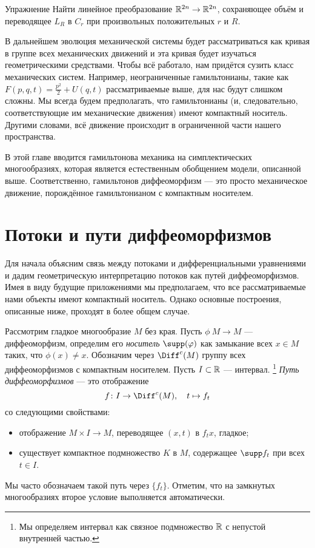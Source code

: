 \begin{ex*}{Упражнение}
Найти линейное преобразование $\mathbb{R}^{2n} \to \mathbb{R}^{2n}$, сохраняющее объём и переводящее $L_R$ в $C_r$ при произвольных положительных $r$ и $R$.
\end{ex*}

В дальнейшем эволюция механической системы будет рассматриваться как кривая в группе всех механических движений и эта кривая будет изучаться геометрическими средствами.
Чтобы всё работало, нам придётся сузить класс механических систем.
Например, неограниченные гамильтонианы, такие как $F(p,q,t) = \tfrac {p^2}2 + U(q,t)$ рассматриваемые выше, для нас будут слишком сложны.
Мы всегда будем предполагать, что гамильтонианы (и, следовательно, соответствующие им механические движения) имеют компактный носитель.
Другими словами, всё движение происходит в ограниченной части нашего пространства.

В этой главе вводится гамильтонова механика на симплектических многообразиях, которая является естественным обобщением модели, описанной выше.
Соответственно, гамильтонов диффеоморфизм — это просто механическое движение, порождённое гамильтонианом с компактным носителем. 

\section{Потоки и пути диффеоморфизмов}

Для начала объясним связь между потоками и дифференциальными уравнениями и дадим геометрическую интерпретацию потоков как путей диффеоморфизмов.
Имея в виду будущие приложениями мы предполагаем, что все рассматриваемые нами объекты имеют компактный носитель.
Однако основные построения, описанные ниже, проходят в более общем случае.

Рассмотрим гладкое многообразие $M$ без края.
Пусть $\phi\: M \to M$ — диффеоморфизм, определим его \emph{носитель} \index[symb]{$\supp(\phi)$}$\supp(\phi)$ как замыкание всех  $x \in M$ таких, что $\phi(x) \ne x$.
Обозначим через $\Diff^c (M)$ группу всех диффеоморфизмов с компактным носителем.
Пусть $I \subset \mathbb{R}$ — интервал.%
\footnote{Мы определяем интервал как связное подмножество $\mathbb{R}$ с непустой внутренней частью.}
\emph{Путь диффеоморфизмов} — это отображение 
\[f\: I \to \Diff^c (M),\quad t \mapsto f_t\]
со следующими свойствами:
\begin{itemize}
\item отображение $M \times I \to M$, переводящее $(x, t)$ в $f_t x$, гладкое;
\item существует компактное подмножество $K$ в $M$, содержащее $\supp f_t$ при всех $t \in I$.
\end{itemize}
Мы часто обозначаем такой путь через $\{f_t\}$.
Отметим, что на замкнутых многообразиях второе условие выполняется автоматически.

